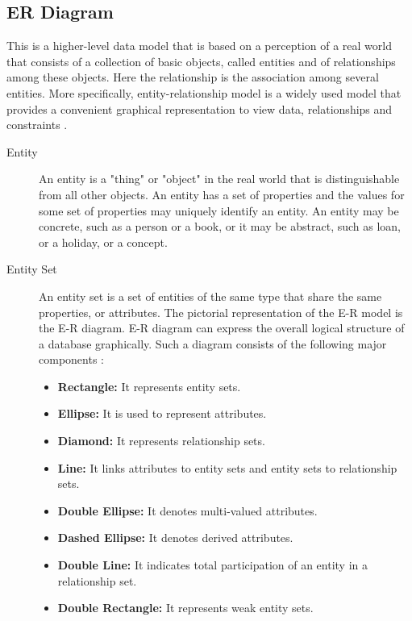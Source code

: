 \subsection{ER Diagram}
This is a higher-level data model that is based on a perception of
a real world that consists of a collection of basic objects,
called entities and of relationships among these objects. Here the
relationship is the association among several entities. More
specifically, entity-relationship model is a widely used model
that provides a convenient graphical representation to view data,
relationships and constraints \citep{silberchatz2006sistema}.
\begin{description}
    \item[Entity \newline] {An entity is a "thing" or "object" in the real world that is distinguishable from all other objects. An entity has a set of properties and the values for some set of properties may uniquely identify an entity. An entity may be concrete, such as a person or a book, or it may be abstract, such as loan, or a holiday, or a concept.}
    \item[Entity Set \newline] {An entity set is a set of entities of the same type that share the same properties, or attributes. The pictorial representation of the E-R model is the E-R diagram. E-R diagram can express the overall logical structure of a database graphically. Such a diagram consists of the following major components \citep{silberchatz2006sistema}:\begin{itemize}
        \item {{\bf Rectangle:} It represents entity sets.}
        \item {{\bf Ellipse:} It is used to represent attributes.}
        \item {{\bf Diamond:} It represents relationship sets.}
        \item {{\bf Line:} It links attributes to entity sets and entity sets to relationship sets.}
        \item {{\bf Double Ellipse:} It denotes multi-valued attributes. }
        \item {{\bf Dashed Ellipse:} It denotes derived attributes. }
        \item {{\bf Double Line:} It indicates total participation of an entity in a relationship set.}
        \item {{\bf Double Rectangle:} It represents weak entity sets.}
    \end{itemize}        }
\end{description}




